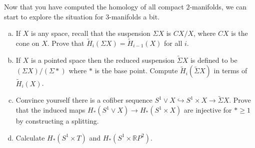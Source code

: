 \documentclass[a4paper, 12pt]{article}
\begin{document}
\begin{problem}{6}
Now that you have computed the homology of all compact \(2\)-manifolds, we can start to explore the situation for \(3\)-manifolds a bit. 
\begin{enumerate}[(a)]
\item If \(X\) is any space, recall that the suspension \(\Sigma X\) is \(CX/X\), where \(CX\) is the cone on \(X\). Prove that \(\tilde{H}_i(\Sigma X)=\tilde{H}_{i-1}(X)\) for all \(i\). 
\item If \(X\) is a pointed space then the reduced suspension \(\tilde{\Sigma}X\) is defined to be \((\Sigma X)/(\Sigma *)\) where \(*\) is the base point. Compute \(\tilde{H}_i(\tilde{\Sigma}X)\) in terms of \(\tilde{H}_i(X)\). 
\item Convince yourself there is a cofiber sequence \(S^1\vee X\hookrightarrow S^1\times X\rightarrow \tilde{\Sigma}X\). Prove that the induced maps \(H_*(S^1\vee X)\rightarrow H_*(S^1\times X)\) are injective for \(*\geq 1\) by constructing a splitting.
\item Calculate \(H_*(S^1\times T)\) and \(H_*(S^1\times \mathbb{R}P^2)\).
\end{enumerate}
\end{problem}
\end{document}
